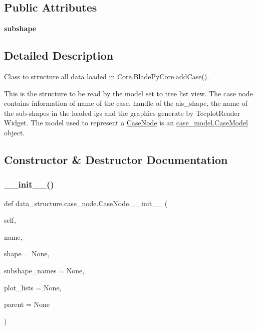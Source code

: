 \subsection*{Public Attributes}
\begin{DoxyCompactItemize}
\item 
\hypertarget{a00089_ac2f5b0ae9715edeac8f9b1ccc0fd64e3}{}\label{a00089_ac2f5b0ae9715edeac8f9b1ccc0fd64e3} 
{\bfseries subshape}
\end{DoxyCompactItemize}


\subsection{Detailed Description}
Class to structure all data loaded in \hyperlink{a00081_a1a62f9b5b8f5929bdb6f0a8c27049d9e}{Core.\+Blade\+Py\+Core.\+add\+Case()}. 

This is the structure to be read by the model set to tree list view. The case node contains information of name of the case, handle of the ais\+\_\+shape, the name of the sub-\/shapes in the loaded igs and the graphics generate by Tecplot\+Reader Widget. The model used to represent a \hyperlink{a00089}{Case\+Node} is an \hyperlink{a00085}{case\+\_\+model.\+Case\+Model} object. 

\subsection{Constructor \& Destructor Documentation}
\hypertarget{a00089_a268359dc0ff12ae9d60b0311f4d20a12}{}\label{a00089_a268359dc0ff12ae9d60b0311f4d20a12} 
\subsubsection{\texorpdfstring{\+\_\+\+\_\+init\+\_\+\+\_\+()}{\_\_init\_\_()}}
{\footnotesize\ttfamily def data\+\_\+structure.\+case\+\_\+node.\+Case\+Node.\+\_\+\+\_\+init\+\_\+\+\_\+ (\begin{DoxyParamCaption}\item[{}]{self,  }\item[{}]{name,  }\item[{}]{shape = {\ttfamily None},  }\item[{}]{subshape\+\_\+names = {\ttfamily None},  }\item[{}]{plot\+\_\+lists = {\ttfamily None},  }\item[{}]{parent = {\ttfamily None} }\end{DoxyParamCaption})}



